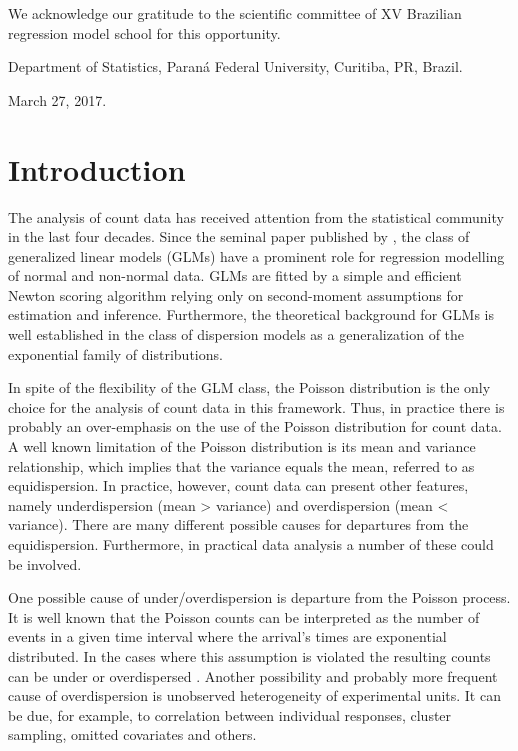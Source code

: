 \documentclass[9pt,a5paper,]{book}
\theoremstyle{definition}
\theoremstyle{definition}
\theoremstyle{remark}
\begin{document}
We acknowledge our gratitude to the scientific committee of XV Brazilian
regression model school for this opportunity.

Department of Statistics, Paraná Federal University, Curitiba, PR,
Brazil.

March 27, 2017.

\chapter{Introduction}\label{introduction}

The analysis of count data has received attention from the statistical
community in the last four decades. Since the seminal paper published by
\citet{Nelder1972}, the class of generalized linear models (GLMs) have a
prominent role for regression modelling of normal and non-normal data.
GLMs are fitted by a simple and efficient Newton scoring algorithm
relying only on second-moment assumptions for estimation and inference.
Furthermore, the theoretical background for GLMs is well established in
the class of dispersion models \citep{Jorgensen1987, Jorgensen1997} as a
generalization of the exponential family of distributions.

In spite of the flexibility of the GLM class, the Poisson distribution
is the only choice for the analysis of count data in this framework.
Thus, in practice there is probably an over-emphasis on the use of the
Poisson distribution for count data. A well known limitation of the
Poisson distribution is its mean and variance relationship, which
implies that the variance equals the mean, referred to as
equidispersion. In practice, however, count data can present other
features, namely underdispersion (mean \textgreater{} variance) and
overdispersion (mean \textless{} variance). There are many different
possible causes for departures from the equidispersion. Furthermore, in
practical data analysis a number of these could be involved.

One possible cause of under/overdispersion is departure from the Poisson
process. It is well known that the Poisson counts can be interpreted as
the number of events in a given time interval where the arrival's times
are exponential distributed. In the cases where this assumption is
violated the resulting counts can be under or overdispersed
\citep{Zeviani2014}. Another possibility and probably more frequent
cause of overdispersion is unobserved heterogeneity of experimental
units. It can be due, for example, to correlation between individual
responses, cluster sampling, omitted covariates and others.
\end{document}
